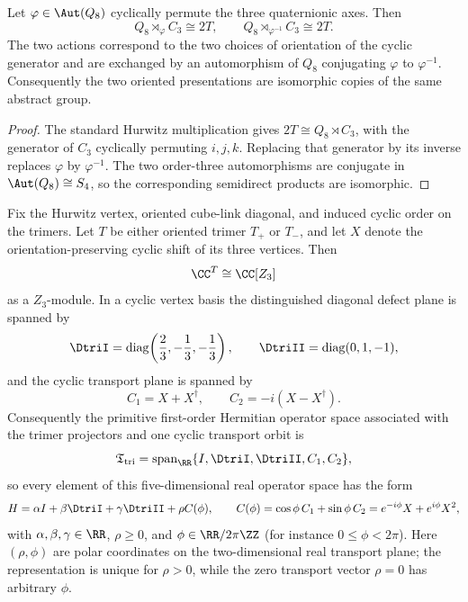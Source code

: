 \documentclass[11pt]{article}
\begin{document}
\begin{proposition}
\label{p1:prop:two-oriented-2T-presentations}
Let \(\varphi\in\Aut(Q_8)\) cyclically permute the three quaternionic axes.
Then
\[
    Q_8\rtimes_{\varphi}C_3\cong2T,
    \qquad
    Q_8\rtimes_{\varphi^{-1}}C_3\cong2T.
\]
The two actions correspond to the two choices of orientation of the cyclic
generator and are exchanged by an automorphism of \(Q_8\) conjugating
\(\varphi\) to \(\varphi^{-1}\).  Consequently the two oriented presentations
are isomorphic copies of the same abstract group.
\end{proposition}

\begin{proof}
The standard Hurwitz multiplication gives
\(2T\cong Q_8\rtimes C_3\), with the generator of \(C_3\) cyclically permuting
\(i,j,k\).  Replacing that generator by its inverse replaces \(\varphi\) by
\(\varphi^{-1}\).  The two order-three automorphisms are conjugate in
\(\Aut(Q_8)\cong S_4\), so the corresponding semidirect products are isomorphic.
\end{proof}

\begin{theorem}
\label{p1:thm:cyclic-trimer-operator-grammar}
Fix the Hurwitz vertex, oriented cube-link diagonal, and induced cyclic order on the trimers.  Let \(T\) be either oriented trimer \(T_+\) or \(T_-\), and let \(X\) denote the
orientation-preserving cyclic shift of its three vertices.  Then
\[
\CC^{T}\cong\CC[Z_3]
\]
as a \(Z_3\)-module.  In a cyclic vertex basis the distinguished diagonal defect
plane is spanned by
\[
\DtriI=\operatorname{diag}\!\left(\frac23,-\frac13,-\frac13\right),
\qquad
\DtriII=\operatorname{diag}(0,1,-1),
\]
and the cyclic transport plane is spanned by
\[
C_1=X+X^\dagger,
\qquad
C_2=-i(X-X^\dagger).
\]
Consequently the primitive first-order Hermitian operator space associated with the trimer
projectors and one cyclic transport orbit is
\[
\mathfrak T_{\rm tri}
=\operatorname{span}_{\RR}\{I,\DtriI,\DtriII,C_1,C_2\},
\]
so every element of this five-dimensional real operator space has the form
\[
H=\alpha I+\beta \DtriI+\gamma \DtriII+\rho C(\phi),
\qquad
C(\phi)=\cos\phi\,C_1+\sin\phi\,C_2
       =e^{-i\phi}X+e^{i\phi}X^2,
\]
with \(\alpha,\beta,\gamma\in\RR\), \(\rho\ge0\), and \(\phi\in\RR/2\pi\ZZ\)
(for instance \(0\le\phi<2\pi\)).  Here \((\rho,\phi)\) are polar coordinates on
the two-dimensional real transport plane; the representation is unique for
\(\rho>0\), while the zero transport vector \(\rho=0\) has arbitrary \(\phi\).
\end{theorem}
\end{document}
